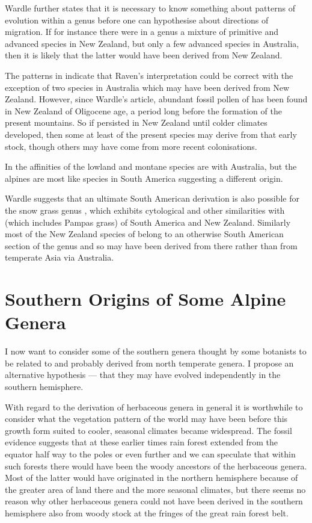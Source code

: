 Wardle further states that it is necessary to know something about patterns of evolution within a genus before one can hypothesise about directions of migration.
If for instance there were in a genus a mixture of primitive and advanced species in New Zealand, but only a few advanced species in Australia, then it is likely that the latter would have been derived from New Zealand.

The patterns in  indicate that Raven's interpretation could be correct with the exception of two species in Australia which may have been derived from New Zealand.
However, since Wardle's article, abundant fossil pollen of  has been found in New Zealand of Oligocene age, a period long before the formation of the present mountains.
So if  persisted in New Zealand until colder climates developed, then some at least of the present species may derive from that early stock, though others may have come from more recent colonisations.

In  the affinities of the lowland and montane species are with Australia, but the alpines are most like species in South America suggesting a different origin.

Wardle suggests that an ultimate South American derivation is also possible for the snow grass genus , which exhibits cytological and other similarities with  (which includes Pampas grass) of South America and New Zealand.
Similarly most of the New Zealand species of  belong to an otherwise South American section of the genus and so may have been derived from there rather than from temperate Asia via Australia.

\section{Southern Origins of Some Alpine Genera}

I now want to consider some of the southern genera thought by some botanists to be related to and probably derived from north temperate genera.
I propose an alternative hypothesis --- that they may have evolved independently in the southern hemisphere.

With regard to the derivation of herbaceous genera in general it is worthwhile to consider what the vegetation pattern of the world may have been before this growth form suited to cooler, seasonal climates became widespread.
The fossil evidence suggests that at these earlier times rain forest extended from the equator half way to the poles or even further and we can speculate that within such forests there would have been the woody ancestors of the herbaceous genera.
Most of the latter would have originated in the northern hemisphere because of the greater area of land there and the more seasonal climates, but there seems no reason why other herbaceous genera could not have been derived in the southern hemisphere also from woody stock at the fringes of the great rain forest belt.

